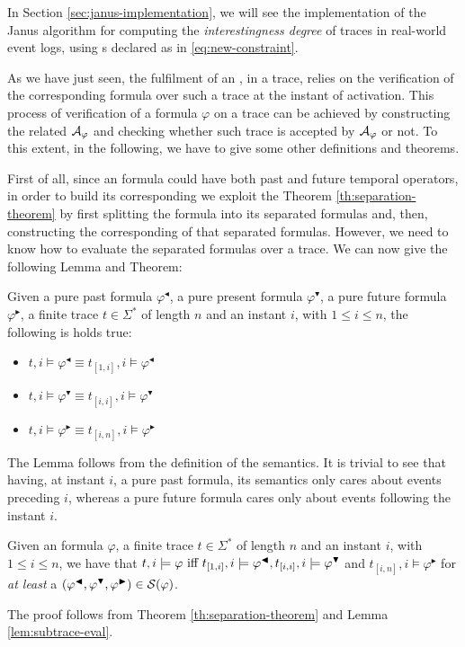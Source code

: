  In Section \ref{sec:janus-implementation}, we will see the implementation of the Janus algorithm for computing the \emph{interestingness degree} of traces in real-world event logs, using \rcon s declared as in \ref{eq:new-constraint}.

As we have just seen, the fulfilment of an \rcon\xspace, in a trace, relies on the verification of the corresponding \LTLp formula over such a trace at the instant of activation. This process of verification of a formula $\varphi$ on a trace can be achieved by constructing the related \DFA $\automaton_{\varphi}$ and checking whether such trace is accepted by $\automaton_{\varphi}$ or not. To this extent, in the following, we have to give some other definitions and theorems.

First of all, since an \LTLp formula could have both past and future temporal operators, in order to build its corresponding \DFA we exploit the Theorem \ref{th:separation-theorem} by first splitting the \LTLp formula into its separated formulas and, then, constructing the corresponding \DFAs of that separated formulas. However, we need to know how to evaluate the separated formulas over a trace. We can now give the following Lemma and Theorem:

\begin{lemma}\citep{cecconi2018interestingness}\label{lem:subtrace-eval}
Given a pure past formula $\varphi^\blacktriangleleft$, a pure present formula $\varphi^\blacktriangledown$, a pure future formula $\varphi^\blacktriangleright$, a finite trace $t \in \Sigma^*$ of length $n$ and an instant $i$, with $1 \le i \le n$, the following is holds true:
\begin{itemize}
\item $t,i \models \varphi^\blacktriangleleft \equiv t_{[1,i]}, i \models \varphi^\blacktriangleleft$
\item $t,i \models \varphi^\blacktriangledown \equiv t_{[i,i]}, i \models \varphi^\blacktriangledown$
\item $t,i \models \varphi^\blacktriangleright \equiv t_{[i,n]}, i \models \varphi^\blacktriangleright$
\end{itemize}
\end{lemma}
The Lemma follows from the definition of the \LTLp semantics. It is trivial to see that having, at instant $i$, a pure past formula, its semantics only cares about events preceding $i$, whereas a pure future formula cares only about events following the instant $i$.
\begin{theorem}\citep{cecconi2018interestingness}\label{th:sepformulas-eval}
Given an \LTLp formula $\varphi$, a finite trace $t \in \Sigma^*$ of length $n$ and an instant $i$, with $1 \le i \le n$, we have that $t,i \models \varphi \tiff t_{[1,i]}, i \models \varphi^\blacktriangleleft, t_{[i,i]}, i \models \varphi^\blacktriangledown$ and $t_{[i,n]}, i \models \varphi^\blacktriangleright$ for \emph{at least} a $(\varphi^{\blacktriangleleft},\varphi^{\blacktriangledown},\varphi^{\blacktriangleright}) \in \S(\varphi)$.
\end{theorem}
The proof follows from Theorem \ref{th:separation-theorem} and Lemma \ref{lem:subtrace-eval}.

